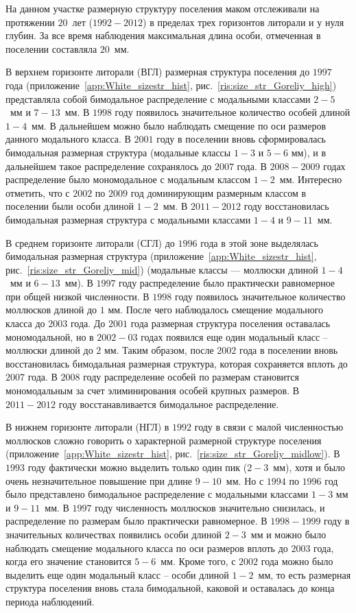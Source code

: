 На данном участке размерную структуру поселения маком отслеживали на протяжении $20$~лет ($1992 - 2012$) в пределах трех горизонтов литорали и у нуля глубин.
За все время наблюдения максимальная длина особи, отмеченная в поселении составляла $20$~мм.

В верхнем горизонте литорали (ВГЛ) размерная структура поселения до $1997$ года (приложение~\ref{app:White_sizestr_hist}, рис.~\ref{ris:size_str_Goreliy_high}) представляла собой бимодальное распределение с модальными классами $2-5$~мм и $7-13$~мм.
В $1998$ году появилось значительное количество особей длиной $1-4$~мм. 
В дальнейшем можно было наблюдать смещение по оси размеров данного модального класса. 
В $2001$ году в поселении вновь сформировалась бимодальная размерная структура (модальные классы $1-3$ и $5-6$ мм), и в дальнейшем такое распределение сохранялось до $2007$ года.
В $2008 - 2009$ годах распределение было мономодальное с модальным классом $1-2$~мм.
Интересно отметить, что с $2002$ по $2009$ год доминирующим размерным классом в поселении были особи длиной $1-2$~мм.
В $2011-2012$ году восстановилась бимодальная размерная структура с модальными классами $1-4$ и $9-11$~мм.

В среднем горизонте литорали (СГЛ) до $1996$ года в этой зоне выделялась бимодальная размерная структура (приложение~\ref{app:White_sizestr_hist}, рис.~\ref{ris:size_str_Goreliy_mid}) (модальные классы --- моллюски длиной $1-4$~мм и $6-13$~мм). 
В $1997$ году распределение было практически равномерное при общей низкой численности. 
В $1998$ году появилось значительное количество моллюсков длиной до $1$ мм. 
После чего наблюдалось смещение модального класса до $2003$ года. 
До $2001$ года размерная структура поселения оставалась мономодальной, но в $2002-03$ годах появился еще один модальный класс -- моллюски длиной до $2$ мм. 
Таким образом, после $2002$ года  в поселении вновь восстановилась бимодальная размерная структура, которая сохраняется вплоть до $2007$ года.
В $2008$ году распределение особей по размерам становится мономодальным за счет элиминирования особей крупных размеров. 
В $2011-2012$ году восстанавливается бимодальное распределение.


В нижнем горизонте литорали (НГЛ) в $1992$ году в связи с малой численностью моллюсков сложно говорить о характерной размерной структуре поселения (приложение~\ref{app:White_sizestr_hist}, рис.~\ref{ris:size_str_Goreliy_midlow}).
В $1993$ году фактически можно выделить только один пик ($2-3$~мм), хотя и было очень незначительное повышение при длине $9-10$~мм. 
Но с $1994$ по $1996$ год было представлено бимодальное распределение с модальными классами $1-3$ мм и $9-11$~мм.
В $1997$ году численность моллюсков значительно снизилась, и распределение по размерам было практически равномерное. 
В $1998-1999$ году в значительных количествах появились особи длиной $2-3$~мм и можно было наблюдать смещение модального класса по оси размеров вплоть до $2003$ года, когда его значение становится $5-6$~мм. 
Кроме того, с $2002$ года можно было выделить еще один модальный класс -- особи длиной $1-2$~мм, то есть размерная структура поселения вновь стала бимодальной, каковой и оставалась до конца периода наблюдений.


